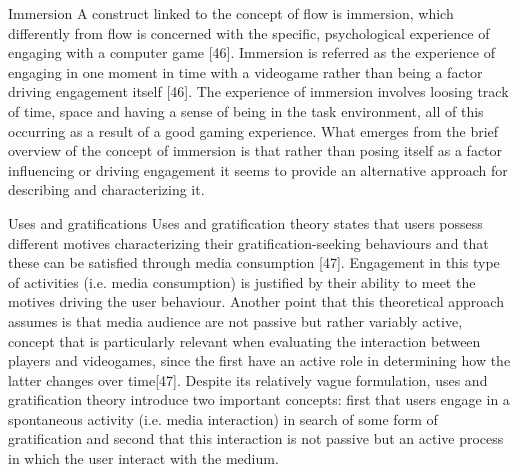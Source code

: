 Immersion
A construct linked to the concept of flow is immersion, which differently from flow is concerned with the specific, psychological experience of engaging with a computer game [46]. Immersion is referred as the experience of engaging in one moment in time with a videogame rather than being a factor driving engagement itself [46]. The experience of immersion involves loosing track of time, space and having a sense of being in the task environment, all of this occurring as a result of a good gaming experience. What emerges from the brief overview of the concept of immersion is that rather than posing itself as a factor influencing or driving engagement it seems to provide an alternative approach for describing and characterizing it.

Uses and gratifications
Uses and gratification theory states that users possess different motives characterizing their gratification-seeking behaviours and that these can be satisfied through media consumption [47]. Engagement in this type of activities (i.e. media consumption) is justified by their ability to meet the motives driving the user behaviour. Another point that this theoretical approach assumes is that media audience are not passive but rather variably active, concept that is particularly relevant when evaluating the interaction between players and videogames, since the first have an active role in determining how the latter changes over time[47]. Despite its relatively vague formulation, uses and gratification theory introduce two important concepts: first that users engage in a spontaneous activity (i.e. media interaction) in search of some form of gratification and second that this interaction is not passive but an active process in which the user interact with the medium.

